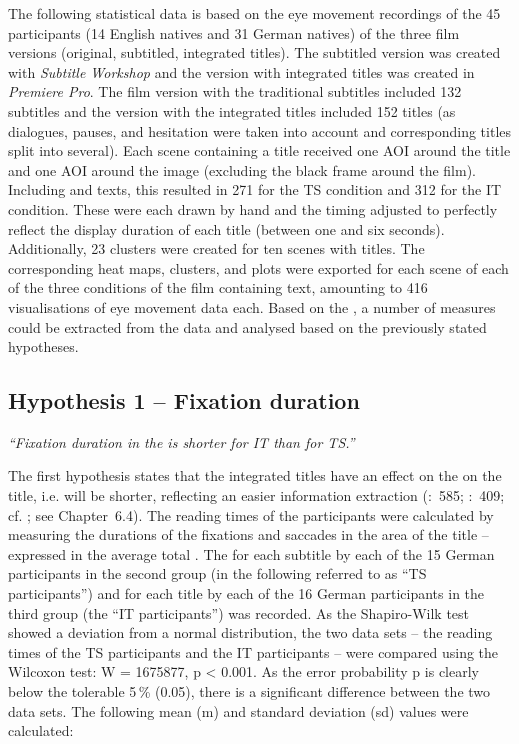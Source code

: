 The following statistical data is based on the eye movement recordings of the 45 participants (14 English natives and 31 German natives) of the three film versions (original, subtitled, integrated titles). The subtitled version was created with \textit{Subtitle Workshop} and the version with integrated titles was created in \textit{Premiere Pro}. The film version with the traditional subtitles included 132 subtitles and the version with the integrated titles included 152 titles (as dialogues, pauses, and hesitation were taken into account and corresponding titles split into several). Each scene containing a title received one AOI around the title and one AOI around the image (excluding the black frame around the film). Including  and  texts, this resulted in 271  for the TS condition and 312  for the IT condition. These  were each drawn by hand and the timing adjusted to perfectly reflect the display duration of each title (between one and six seconds). Additionally, 23 clusters were created for ten scenes with titles. The corresponding heat maps, clusters, and  plots were exported for each scene of each of the three conditions of the film containing text, amounting to 416 visualisations of eye movement data each. Based on the , a number of measures could be extracted from the data and analysed based on the previously stated hypotheses. 


\subsection{Hypothesis 1 – Fixation duration}\label{sec:8.1.1}

\textit{“Fixation duration in the  is shorter for IT than for TS.”}

\bigskip

The first hypothesis states that the integrated titles have an effect on the  on the title, i.e.  will be shorter, reflecting an easier information extraction (\citealt{Jacob2003}:~585; \citealt{mccarthy2003}:~409; cf. \citealt{Fitts1950}; see Chapter~6.4). The reading times of the participants were calculated by measuring the durations of the fixations and saccades in the area of the title – expressed in the average total . The  for each subtitle by each of the 15 German participants in the second group (in the following referred to as “TS participants”) and for each title by each of the 16 German participants in the third group (the “IT participants”) was recorded. As the Shapiro-Wilk test showed a deviation from a normal distribution, the two data sets – the reading times of the TS participants and the IT participants – were compared using the Wilcoxon test: W = 1675877, p < 0.001. As the error probability p is clearly below the tolerable 5\,\% (0.05), there is a significant difference between the two data sets. The following mean (m) and standard deviation (sd) values were calculated:
\bigskip

